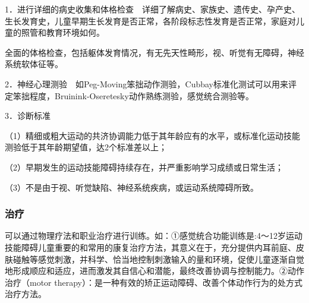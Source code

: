 1．进行详细的病史收集和体格检查　详细了解病史、家族史、遗传史、孕产史、生长发育史，儿童早期生长发育是否正常，各阶段标志性发育是否正常，家庭对儿童的照管和教育环境如何。

全面的体格检查，包括躯体发育情况，有无先天性畸形，视、听觉有无障碍，神经系统软体征等。

2．神经心理测验　如Peg-Moving笨拙动作测验，Cubbay标准化测试可以用来评定笨拙程度，Bruinink-Oseretesky动作熟练测验，感觉统合测验等。

3．诊断标准

（1）精细或粗大运动的共济协调能力低于其年龄应有的水平，或标准化运动技能测验低于其年龄期望值，达2个标准差以上；

（2）早期发生的运动技能障碍持续存在，并严重影响学习成绩或日常生活；

（3）不是由于视、听觉缺陷、神经系统疾病，或运动系统障碍所致。

\subsubsection{治疗}

可以通过物理疗法和职业治疗进行训练。如：①感觉统合功能训练是:4～12岁运动技能障碍儿童重要的和常用的康复治疗方法，其意义在于，充分提供内耳前庭、皮肤碰触等感觉刺激，并科学、恰当地控制刺激输入的量和环境，促使儿童逐渐自觉地形成顺应和适应，进而激发其自信心和潜能，最终改善协调与控制能力。②动作治疗（motor
therapy）：是一种有效的矫正运动障碍、改善个体动作行为的处方式治疗方法。